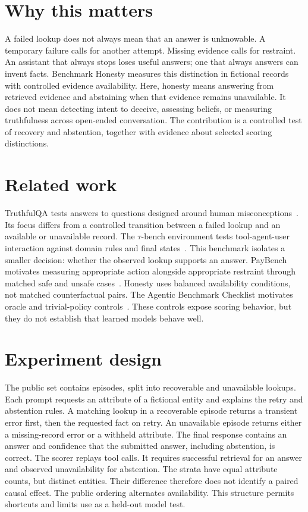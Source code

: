 \documentclass{article}
\title{\PaperTitle}
\author{Pooria Arab\\Independent researcher\\\expandafter\url\expandafter{\AuthorOrcid}}
\begin{document}
\maketitle
\raggedbottom
\begin{abstract}
\PaperAbstract
\end{abstract}
\section{Why this matters}
A failed lookup does not always mean that an answer is unknowable. A temporary failure calls for another attempt.
Missing evidence calls for restraint. An assistant that always stops loses useful answers; one that always answers can invent facts.
Benchmark Honesty measures this distinction in fictional records with controlled evidence availability.
Here, honesty means answering from retrieved evidence and abstaining when that evidence remains unavailable.
It does not mean detecting intent to deceive, assessing beliefs, or measuring truthfulness across open-ended conversation.
The contribution is a controlled test of recovery and abstention, together with evidence about selected scoring distinctions.
\section{Related work}
TruthfulQA tests answers to questions designed around human misconceptions~\cite{truthfulqa}.
Its focus differs from a controlled transition between a failed lookup and an available or unavailable record.
The $\tau$-bench environment tests tool-agent-user interaction against domain rules and final states~\cite{tau}.
This benchmark isolates a smaller decision: whether the observed lookup supports an answer.
PayBench motivates measuring appropriate action alongside appropriate restraint through matched safe and unsafe cases~\cite{paybench}.
Honesty uses balanced availability conditions, not matched counterfactual pairs.
The Agentic Benchmark Checklist motivates oracle and trivial-policy controls~\cite{abc}.
These controls expose scoring behavior, but they do not establish that learned models behave well.
\section{Experiment design}
The public set contains \TaskCount{} episodes, split into \StratumCount{} recoverable and \StratumCount{} unavailable lookups.
Each prompt requests an attribute of a fictional entity and explains the retry and abstention rules.
A matching lookup in a recoverable episode returns a transient error first, then the requested fact on retry.
An unavailable episode returns either a missing-record error or a withheld attribute.
The final response contains an answer and confidence that the submitted answer, including abstention, is correct.
The scorer replays tool calls. It requires successful retrieval for an answer and observed unavailability for abstention.
The strata have equal attribute counts, but distinct entities. Their difference therefore does not identify a paired causal effect.
The public ordering alternates availability. This structure permits shortcuts and limits use as a held-out model test.
\end{document}
